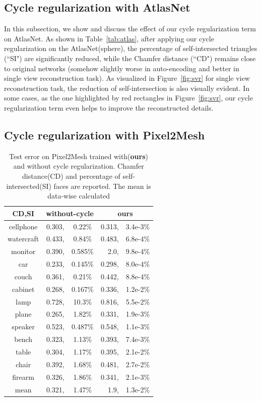 \subsection{Cycle regularization with AtlasNet}
In this subsection, we show and discuss the effect of our cycle regularization term on AtlasNet\cite{atlasnet}. As shown in Table~\ref{tab:atlas}, after applying our cycle regularization on the AtlasNet(sphere), the percentage of self-intersected triangles (``SI") are significantly reduced, while the Chamfer distance (``CD") remains close to original networks (somehow slightly worse in auto-encoding and better in single view reconstruction task). As visualized in Figure~\ref{fig:svr} for single view reconstruction task, the reduction of self-intersection is also visually evident. In some cases, as the one highlighted by red rectangles in Figure~\ref{fig:svr}, our cycle regularization term even helps to improve the reconstructed details.
\subsection{Cycle regularization with Pixel2Mesh}

\begin{table}
	\caption{Test error on Pixel2Mesh trained with(\textbf{ours}) and without cycle regularization. Chamfer distance(CD) and percentage of self-intersected(SI) faces are reported. The mean is data-wise calculated}
	\label{tab:p2m}
	\centering
	\begin{tabular}{c|rc|rc|}
		CD,SI& \multicolumn{2}{c|}{without-cycle} & \multicolumn{2}{c|}{ours}\\
		\hline
		cellphone&0.303,&0.22\%&0.313,&3.4e-3\%\\
		watercraft&0.433,&0.84\%&0.483,&6.8e-4\%\\
		monitor&0.390,&0.585\%&2.0,&9.8e-4\%\\
		car&0.233,&0.145\%&0.298,&8.0e-4\%\\
		couch&0.361,&0.21\%&0.442,&8.8e-4\%\\
		cabinet&0.268,&0.167\%&0.336,&1.2e-2\%\\
		lamp&0.728,&10.3\%&0.816,&5.5e-2\%\\
		plane&0.265,&1.82\%&0.331,&1.9e-3\%\\
		speaker&0.523,&0.487\%&0.548,&1.1e-3\%\\
		bench&0.323,&1.13\%&0.393,&7.4e-3\%\\
		table&0.304,&1.17\%&0.395,&2.1e-2\%\\
		chair&0.392,&1.68\%&0.481,&2.7e-2\%\\
		firearm&0.326,&1.86\%&0.341,&2.1e-3\%\\
		\hline
		mean &0.321,&1.47\%&1.9,& 1.3e-2\%\\
		
	\end{tabular}
\end{table}

